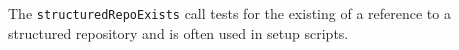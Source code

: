 The \verb+structuredRepoExists+ call tests for the existing of a reference to a structured repository and is often
used in setup scripts.

